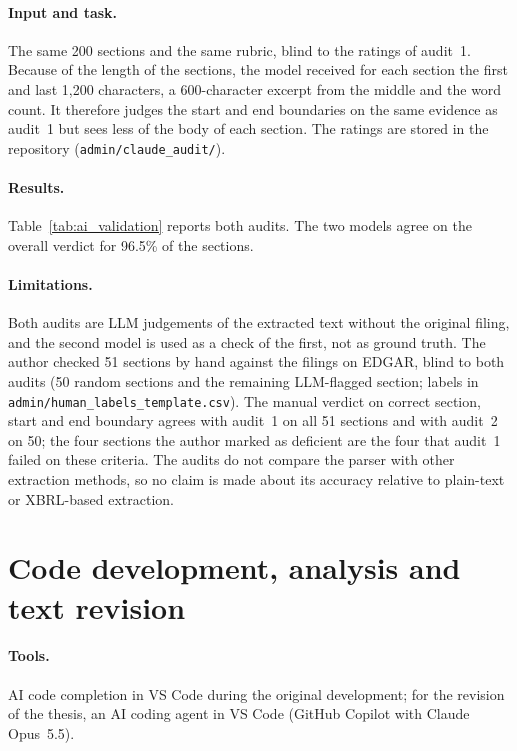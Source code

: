 \paragraph{Input and task.} The same 200 sections and the same rubric, blind
to the ratings of audit~1. Because of the length of the sections, the model
received for each section the first and last 1{,}200 characters, a
600-character excerpt from the middle and the word count. It therefore
judges the start and end boundaries on the same evidence as audit~1 but sees
less of the body of each section. The ratings are stored in the repository
(\texttt{admin/claude\_audit/}).

\paragraph{Results.} Table~\ref{tab:ai_validation} reports both audits. The
two models agree on the overall verdict for 96.5\% of the sections.



\paragraph{Limitations.} Both audits are LLM judgements of the extracted text
without the original filing, and the second model is used as a check of the
first, not as ground truth. The author checked 51 sections by hand against
the filings on EDGAR, blind to both audits (50 random sections and the
remaining LLM-flagged section; labels in
\texttt{admin/human\_labels\_template.csv}). The manual verdict on correct
section, start and end boundary agrees with audit~1 on all 51 sections and
with audit~2 on 50; the four sections the author marked as deficient are the
four that audit~1 failed on these criteria. The audits do not compare the
parser with other
extraction methods, so no claim is made about its accuracy relative to
plain-text or XBRL-based extraction.

\section*{Code development, analysis and text revision}

\paragraph{Tools.} AI code completion in VS Code during the original
development; for the revision of the thesis, an AI coding agent in VS Code
(GitHub Copilot with Claude Opus~5.5).

